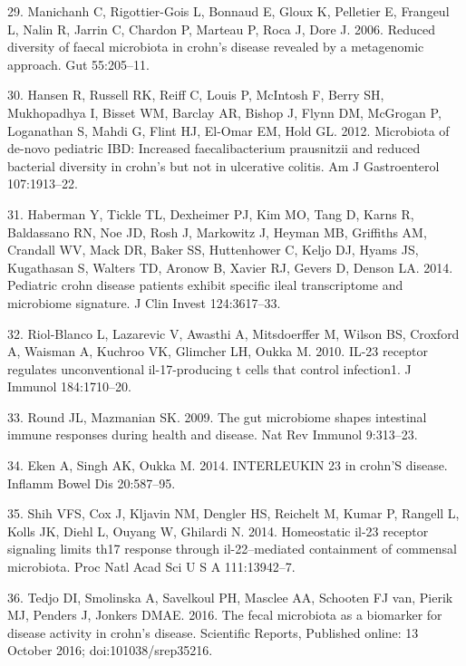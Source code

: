 \documentclass[12pt,]{article}
\begin{document}
\hypertarget{ref-manichanh_diversityCD_2006}{}
29. Manichanh C, Rigottier-Gois L, Bonnaud E, Gloux K, Pelletier E,
Frangeul L, Nalin R, Jarrin C, Chardon P, Marteau P, Roca J, Dore J.
2006. Reduced diversity of faecal microbiota in crohn's disease revealed
by a metagenomic approach. Gut 55:205--11.

\hypertarget{ref-hansen_pedsIBD_2012}{}
30. Hansen R, Russell RK, Reiff C, Louis P, McIntosh F, Berry SH,
Mukhopadhya I, Bisset WM, Barclay AR, Bishop J, Flynn DM, McGrogan P,
Loganathan S, Mahdi G, Flint HJ, El-Omar EM, Hold GL. 2012. Microbiota
of de-novo pediatric IBD: Increased faecalibacterium prausnitzii and
reduced bacterial diversity in crohn's but not in ulcerative colitis. Am
J Gastroenterol 107:1913--22.

\hypertarget{ref-haberman_pedsCD_2014}{}
31. Haberman Y, Tickle TL, Dexheimer PJ, Kim MO, Tang D, Karns R,
Baldassano RN, Noe JD, Rosh J, Markowitz J, Heyman MB, Griffiths AM,
Crandall WV, Mack DR, Baker SS, Huttenhower C, Keljo DJ, Hyams JS,
Kugathasan S, Walters TD, Aronow B, Xavier RJ, Gevers D, Denson LA.
2014. Pediatric crohn disease patients exhibit specific ileal
transcriptome and microbiome signature. J Clin Invest 124:3617--33.

\hypertarget{ref-Riol-Blanco_IL23microbiome_2010}{}
32. Riol-Blanco L, Lazarevic V, Awasthi A, Mitsdoerffer M, Wilson BS,
Croxford A, Waisman A, Kuchroo VK, Glimcher LH, Oukka M. 2010. IL-23
receptor regulates unconventional il-17-producing t cells that control
infection1. J Immunol 184:1710--20.

\hypertarget{ref-Round_IL23microbiome_2009}{}
33. Round JL, Mazmanian SK. 2009. The gut microbiome shapes intestinal
immune responses during health and disease. Nat Rev Immunol 9:313--23.

\hypertarget{ref-Eken_IL23CD_2014}{}
34. Eken A, Singh AK, Oukka M. 2014. INTERLEUKIN 23 in crohn'S disease.
Inflamm Bowel Dis 20:587--95.

\hypertarget{ref-Shih_IL23Th17_2014}{}
35. Shih VFS, Cox J, Kljavin NM, Dengler HS, Reichelt M, Kumar P,
Rangell L, Kolls JK, Diehl L, Ouyang W, Ghilardi N. 2014. Homeostatic
il-23 receptor signaling limits th17 response through il-22--mediated
containment of commensal microbiota. Proc Natl Acad Sci U S A
111:13942--7.

\hypertarget{ref-tedjo_CDactivity_2016}{}
36. Tedjo DI, Smolinska A, Savelkoul PH, Masclee AA, Schooten FJ van,
Pierik MJ, Penders J, Jonkers DMAE. 2016. The fecal microbiota as a
biomarker for disease activity in crohn's disease. Scientific Reports,
Published online: 13 October 2016; doi:101038/srep35216.
\end{document}
